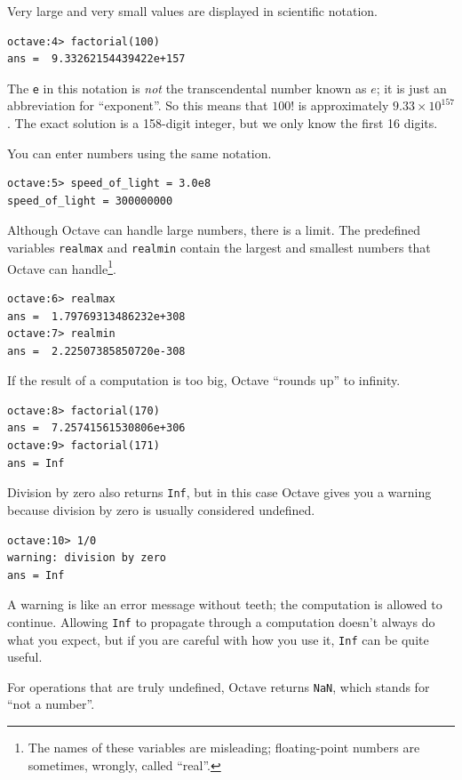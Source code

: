 \documentclass{book}
\begin{document}
Very large and very small values are displayed in scientific notation.

\begin{verbatim}
octave:4> factorial(100)
ans =  9.33262154439422e+157
\end{verbatim}

The {\tt e} in this notation is {\em not} the transcendental number
known as $e$; it is just an abbreviation for ``exponent''. So
this means that $100!$ is approximately $9.33 \times 10^{157}$. The
exact solution is a 158-digit integer, but we only know the first 16
digits.

You can enter numbers using the same notation.

\begin{verbatim}
octave:5> speed_of_light = 3.0e8
speed_of_light = 300000000
\end{verbatim}

Although Octave can handle large numbers, there is a limit. The
predefined variables {\tt realmax} and {\tt realmin} contain the
largest and smallest numbers that Octave can handle\footnote{The names
of these variables are misleading; floating-point numbers are
sometimes, wrongly, called ``real''.}.

\begin{verbatim}
octave:6> realmax
ans =  1.79769313486232e+308
octave:7> realmin
ans =  2.22507385850720e-308
\end{verbatim}

If the result of a computation is too big, Octave ``rounds up''
to infinity.

\begin{verbatim}
octave:8> factorial(170)
ans =  7.25741561530806e+306
octave:9> factorial(171)
ans = Inf
\end{verbatim}

Division by zero also returns {\tt Inf}, but in this case Octave
gives you a warning because division by zero is usually
considered undefined.

\begin{verbatim}
octave:10> 1/0
warning: division by zero
ans = Inf
\end{verbatim}

A warning is like an error message without teeth; the computation
is allowed to continue. Allowing {\tt Inf} to propagate
through a computation doesn't always do what you expect, but if you
are careful with how you use it, {\tt Inf} can be quite useful.

For operations that are truly undefined, Octave returns {\tt NaN},
which stands for ``not a number''.
\end{document}
